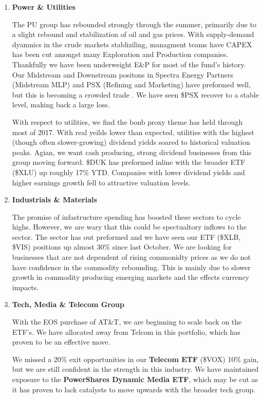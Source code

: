 \documentclass[11pt,pressrelease]{newlfm} %
\begin{document}
\begin{newlfm}
\begin{singlespace}
\begin{enumerate}
\item \textbf{Power \& Utilities} \par
The PU group has rebounded strongly through the summer, primarily due to a slight rebound and stabilization of oil and gas prices. With supply-demand dyamnics in the crude markets stabliziling, managment teams have  CAPEX has been cut amongst many Exploration and Production companies. Thankfully we have been underweight E\&P for most of the fund's history. Our Midstream and Downstream positons in Spectra Energy Partners (Midstream MLP) and PSX (Refining and Marketing) have preformed well, but this is becoming a crowded trade . We have seen \$PSX recover to a stable level, making back a large loss. 

With respect to utilities, we find the bonb proxy theme has held through most of 2017. With real yeilds lower than expected, utilities with the highest (though often slower-growing) dividend yields soared to historical valuation peaks. Agian, we want cash producing, strong dividend businesses from this group moving forward. \$DUK has preformed inline with the broader ETF (\$XLU) up roughly 17\% YTD. Companies with lower dividend yields and higher earnings growth fell to attractive valuation levels.

\item \textbf{Industrials \& Materials} \par

The promise of infastructure spending has boosted these sectors to cycle highs. However, we are wary that this could be spectualtory inflows to the sector. The sector has out preformed and we have seen our ETF (\$XLB, \$VIS) positions up almost 30\% since last October. We are looking for businesses that are not dependent of rising commonidty prices as we do not have confidence in the commodity rebounding. This is mainly due to slower growth in commodity producing emerging markets and the effects currency impacts.

\item \textbf{Tech, Media \& Telecom Group} \par
With the EOS purchase of AT\&T, we are beginning to scale back on the ETF's. We have allocated away from Telcom in this portfolio, which has proven to be an effective move.

We missed a 20\% exit opportunities in our \textbf{Telecom ETF} (\$VOX) 10\% gain, but we are still confident in the strength in this industry. We have maintained exposure to the \textbf{PowerShares Dynamic Media ETF}, which may be cut as it has proven to lack catalysts to move upwards with the broader tech group. 


\end{enumerate}
\end{singlespace}
\end{newlfm}
\end{document}
